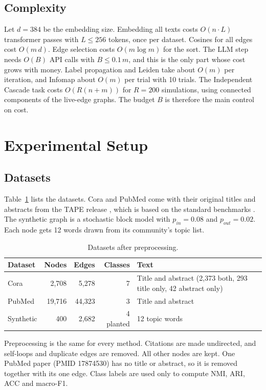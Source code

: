 \documentclass[journal]{IEEEtran}
\begin{document}
\subsection{Complexity}
Let $d=384$ be the embedding size. Embedding all texts costs $O(n\cdot L)$ transformer passes with $L\le 256$ tokens, once per dataset. Cosines for all edges cost $O(m\,d)$. Edge selection costs $O(m\log m)$ for the sort. The LLM step needs $O(B)$ API calls with $B\le 0.1\,m$, and this is the only part whose cost grows with money. Label propagation and Leiden take about $O(m)$ per iteration, and Infomap about $O(m)$ per trial with 10 trials. The Independent Cascade task costs $O(R(n+m))$ for $R=200$ simulations, using connected components of the live-edge graphs. The budget $B$ is therefore the main control on cost.

\section{Experimental Setup}
\label{sec:setup}
\subsection{Datasets}
Table~\ref{tab:data} lists the datasets. Cora and PubMed come with their original titles and abstracts from the TAPE release \cite{he2024}, which is based on the standard benchmarks \cite{sen2008}. The synthetic graph is a stochastic block model with $p_{in}=0.08$ and $p_{out}=0.02$. Each node gets 12 words drawn from its community's topic list.

\begin{table}[!t]
\centering
\caption{Datasets after preprocessing.}
\label{tab:data}
\small
\begin{tabular}{@{}lrrrp{2.4cm}@{}}
\toprule
Dataset & Nodes & Edges & Classes & Text \\
\midrule
Cora & 2,708 & 5,278 & 7 & Title and abstract (2,373 both, 293 title only, 42 abstract only) \\
PubMed & 19,716 & 44,323 & 3 & Title and abstract \\
Synthetic & 400 & 2,682 & 4 planted & 12 topic words \\
\bottomrule
\end{tabular}
\end{table}

Preprocessing is the same for every method. Citations are made undirected, and self-loops and duplicate edges are removed. All other nodes are kept. One PubMed paper (PMID 17874530) has no title or abstract, so it is removed together with its one edge. Class labels are used only to compute NMI, ARI, ACC and macro-F1.
\end{document}
